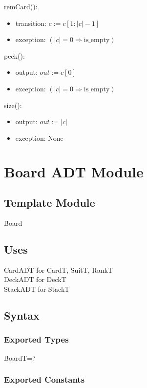 \documentclass[12pt]{article}
\newcommand{\means}{\Rightarrow}
\newcommand{\m}[1]{\mbox{#1}}
\begin{document}
\noindent remCard():
\begin{itemize}
    \item transition: $c := c[1:|c|-1]$
    \item exception: $(|c|=0 \means \m{is\_empty})$
\end{itemize}

\noindent peek():
\begin{itemize}
    \item output: $out := c[0]$
    \item exception: $(|c|=0 \means \m{is\_empty})$
\end{itemize}

\noindent size():
\begin{itemize}
    \item output: $out := |c|$
    \item exception: None
\end{itemize}

\newpage

\section*{Board ADT Module}

\subsection*{Template Module}

Board

\subsection*{Uses}

CardADT for CardT, SuitT, RankT\\
DeckADT for DeckT\\
StackADT for StackT\\

\subsection*{Syntax}

\subsubsection*{Exported Types}

BoardT=?

\subsubsection*{Exported Constants}
\end{document}
